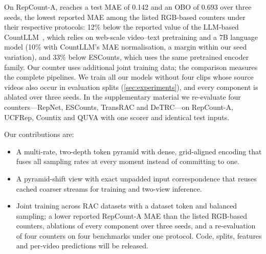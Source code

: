 On RepCount-A, \method reaches a test MAE of 0.142 and an OBO of 0.693 over three
seeds, the lowest reported MAE among the listed RGB-based counters under their
respective protocols: 12\% below the reported value of the LLM-based
CountLLM~\cite{yao2025countllm}, which relies on web-scale video--text
pretraining and a 7B language model (10\% with CountLLM's MAE normalisation, a
margin within our seed variation), and 33\% below ESCounts, which uses the
same pretrained encoder family. Our counter uses additional joint training data;
the comparison measures the complete pipelines. We train all our models without
four clips whose source videos also occur in evaluation splits
(\cref{sec:experiments}), and every component is ablated over three seeds. In the
supplementary material we re-evaluate four counters---RepNet, ESCounts, TransRAC
and DeTRC---on RepCount-A, UCFRep, Countix and QUVA with one scorer and identical
test inputs.

Our contributions are:
\begin{itemize}
  \setlength\itemsep{0pt}
  \setlength\parskip{0pt}
  \item A multi-rate, two-depth token pyramid with dense, grid-aligned encoding
  that fuses all sampling rates at every moment instead of committing to one.
  \item A pyramid-shift view with exact unpadded input correspondence that reuses
  cached coarser streams for training and two-view inference.
  \item Joint training across RAC datasets with a dataset token and balanced
  sampling; a lower reported RepCount-A MAE than the listed RGB-based counters,
  ablations of every component over three seeds, and a re-evaluation of four
  counters on four benchmarks under one protocol. Code, splits, features and
  per-video predictions will be released.
\end{itemize}
